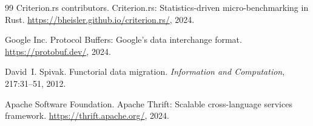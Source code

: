 \documentclass[11pt,a4paper]{article}
\theoremstyle{definition}
\theoremstyle{remark}
\begin{document}
\begin{thebibliography}{99}
Criterion.rs contributors.
\newblock Criterion.rs: Statistics-driven micro-benchmarking in Rust.
\newblock \url{https://bheisler.github.io/criterion.rs/}, 2024.

Google Inc.
\newblock Protocol Buffers: Google's data interchange format.
\newblock \url{https://protobuf.dev/}, 2024.

David~I. Spivak.
\newblock Functorial data migration.
\newblock \emph{Information and Computation}, 217:31--51, 2012.

Apache Software Foundation.
\newblock Apache Thrift: Scalable cross-language services framework.
\newblock \url{https://thrift.apache.org/}, 2024.

\end{thebibliography}
\end{document}
